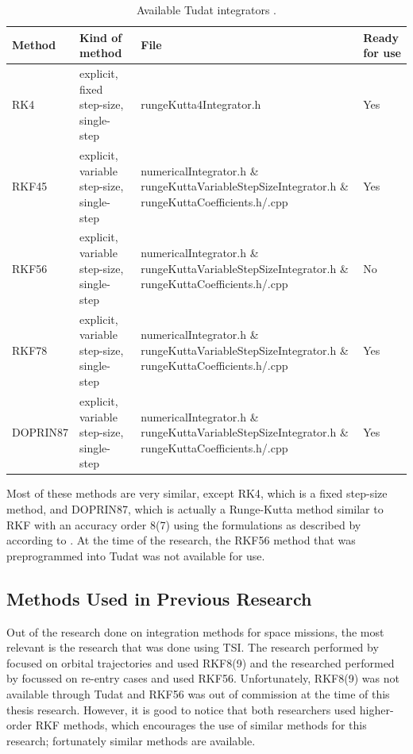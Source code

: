 \begin{table}[H]
\begin{center}
\caption{Available \ac{Tudat} integrators \citep{dirkx2016tudat}.}
\label{tab:tudatIntegrators}
\begin{tabularx}{1.0\textwidth}{|l|p{3.5cm}|X|p{1.0cm}|}
\hline 
\textbf{Method} & \textbf{Kind of method}		& \textbf{File} & \textbf{Ready for use} \\ \hline \hline
\ac{RK4} 	& explicit, fixed step-size, single-step & rungeKutta4Integrator.h & Yes  \\ \hline
\ac{RKF45} 	& explicit,  variable step-size, single-step & numericalIntegrator.h \& rungeKuttaVariableStepSizeIntegrator.h
\& rungeKuttaCoefficients.h/.cpp &  Yes \\ \hline
\acs{RKF56} 	& explicit, variable step-size, single-step & numericalIntegrator.h \& rungeKuttaVariableStepSizeIntegrator.h
\& rungeKuttaCoefficients.h/.cpp & No  \\ \hline
\ac{RKF78} &	explicit, variable step-size, single-step & numericalIntegrator.h \& rungeKuttaVariableStepSizeIntegrator.h
\& rungeKuttaCoefficients.h/.cpp &  Yes \\ \hline
\acs{DOPRIN87} 	& explicit, variable step-size, single-step & numericalIntegrator.h \& rungeKuttaVariableStepSizeIntegrator.h
\& rungeKuttaCoefficients.h/.cpp & Yes  \\ \hline
 	
 		
\end{tabularx}
\end{center}
\end{table}

\noindent
Most of these methods are very similar, except \ac{RK4}, which is a fixed step-size method, and \ac{DOPRIN87}, which is actually a Runge-Kutta method similar to \ac{RKF} with an accuracy order 8(7) using the formulations as described by \cite{prince1981high} according to \cite{weeks2007comparison}. At the time of the research, the \ac{RKF56} method that was preprogrammed into \ac{Tudat} was not available for use.

\subsection{Methods Used in Previous Research}
\label{subsec:methodsUsedInPreviousResearch}
Out of the research done on integration methods for space missions, the most relevant is the research that was done using \ac{TSI}. The research performed by \cite{scott2008high} focused on orbital trajectories and used RKF8(9) and the researched performed by \cite{bergsma2016application} focussed on re-entry cases and used \ac{RKF56}. Unfortunately, RKF8(9) was not available through \ac{Tudat} and \ac{RKF56} was out of commission at the time of this thesis research. However, it is good to notice that both researchers used higher-order RKF methods, which encourages the use of similar methods for this research; fortunately similar methods are available.

